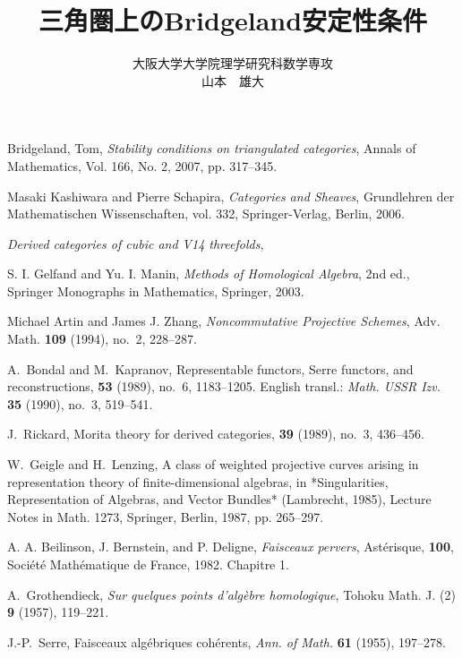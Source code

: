 \documentclass[eqno]{ltjsarticle}
\begin{document}
\title{三角圏上のBridgeland安定性条件}
\date{}
\author{大阪大学大学院理学研究科数学専攻\\山本　雄大}
\maketitle
\tableofcontents










\begin{thebibliography}{99}
	Bridgeland, Tom,
		\textit{Stability conditions on triangulated categories},
	Annals of Mathematics, Vol. 166, No. 2, 2007, pp. 317–345.

	Masaki Kashiwara and Pierre Schapira,
		\textit{Categories and Sheaves},
	Grundlehren der Mathematischen Wissenschaften, vol. 332,
	Springer-Verlag, Berlin, 2006.

	\textit{Derived categories of cubic and V14 threefolds},

	S. I. Gelfand and Yu. I. Manin,
	\textit{Methods of Homological Algebra}, 2nd ed.,
	Springer Monographs in Mathematics, Springer, 2003.

	Michael Artin and James J. Zhang,
	\textit{Noncommutative Projective Schemes},
	Adv. Math. \textbf{109} (1994), no.~2, 228--287.

	A.~Bondal and M.~Kapranov,
	\newblock Representable functors, Serre functors, and reconstructions,
	 \textbf{53} (1989), no.~6, 1183--1205.
	\newblock English transl.: {\em Math. USSR Izv.} \textbf{35} (1990), no.~3, 519--541.

	J.~Rickard,
	\newblock Morita theory for derived categories,
	 \textbf{39} (1989), no.~3, 436--456.


	W.~Geigle and H.~Lenzing,
	\newblock A class of weighted projective curves arising in representation theory of finite-dimensional algebras,
	\newblock in *Singularities, Representation of Algebras, and Vector Bundles* (Lambrecht, 1985), Lecture Notes in Math. 1273, Springer, Berlin, 1987, pp. 265–297.
	
	A. A. Beilinson, J. Bernstein, and P. Deligne,
	\textit{Faisceaux pervers},
	Astérisque, \textbf{100}, Société Mathématique de France, 1982. Chapitre 1.

	A.~Grothendieck,
	\textit{Sur quelques points d'algèbre homologique},
	Tohoku Math. J. (2) \textbf{9} (1957), 119--221.

	J.-P.~Serre,
	\newblock Faisceaux algébriques cohérents,
	\newblock \emph{Ann. of Math.} \textbf{61} (1955), 197--278.

\end{thebibliography}
\end{document}
